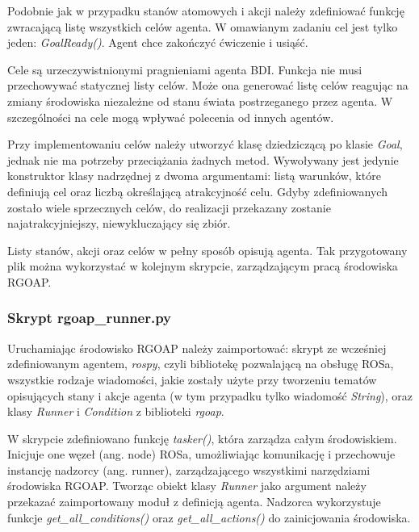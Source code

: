 Podobnie jak w przypadku stanów atomowych i akcji należy zdefiniować funkcję zwracającą listę wszystkich celów agenta. W omawianym zadaniu cel jest tylko jeden: \textit{GoalReady()}. Agent chce zakończyć ćwiczenie i usiąść. 

Cele są urzeczywistnionymi pragnieniami agenta BDI. Funkcja nie musi przechowywać statycznej listy celów. Może ona generować listę celów reagując na zmiany środowiska niezależne od stanu świata postrzeganego przez agenta. W szczególności na cele mogą wpływać polecenia od innych agentów.


Przy implementowaniu celów należy utworzyć klasę dziedziczącą po klasie \textit{Goal}, jednak nie ma potrzeby przeciążania żadnych metod. Wywoływany jest jedynie konstruktor klasy nadrzędnej z dwoma argumentami: listą warunków, które definiują cel oraz liczbą określającą atrakcyjność celu. Gdyby zdefiniowanych zostało wiele sprzecznych celów, do realizacji przekazany zostanie najatrakcyjniejszy, niewykluczający się zbiór.


Listy stanów, akcji oraz celów w pełny sposób opisują agenta. Tak przygotowany plik można wykorzystać w kolejnym skrypcie, zarządzającym pracą środowiska RGOAP.

\subsubsection{Skrypt rgoap\_runner.py}

Uruchamiając środowisko RGOAP należy zaimportować: skrypt ze wcześniej zdefiniowanym agentem, \textit{rospy}, czyli bibliotekę pozwalającą na obsługę ROSa, wszystkie rodzaje wiadomości, jakie zostały użyte przy tworzeniu tematów opisujących stany i akcje agenta (w tym przypadku tylko wiadomość \textit{String}), oraz klasy \textit{Runner} i \textit{Condition} z biblioteki \textit{rgoap}. 


W skrypcie zdefiniowano funkcję \textit{tasker()}, która zarządza całym środowiskiem. Inicjuje one węzeł (ang. node) ROSa, umożliwiając komunikację i przechowuje instancję nadzorcy (ang. runner), zarządzającego wszystkimi narzędziami środowiska RGOAP. Tworząc obiekt klasy \textit{Runner} jako argument należy przekazać zaimportowany moduł z definicją agenta. Nadzorca wykorzystuje funkcje \textit{get\_all\_conditions()} oraz \textit{get\_all\_actions()} do zainicjowania środowiska.


